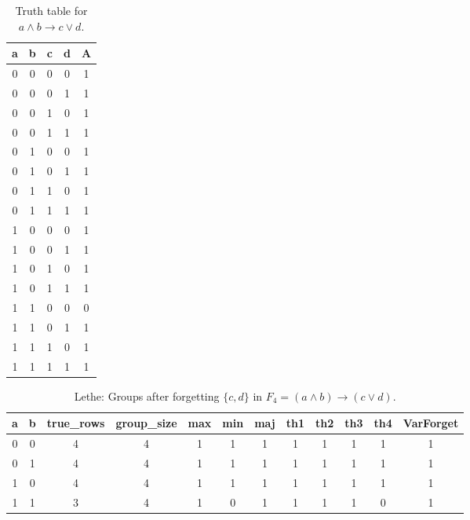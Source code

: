 \begin{table}[!tb]
    \centering
    \begin{tabular}{|c|c|c|c|c|}
        \hline
        \textbf{a} & \textbf{b} & \textbf{c} & \textbf{d} & \textbf{A} \\ \hline
        0 & 0 & 0 & 0 & 1 \\ \hline
        0 & 0 & 0 & 1 & 1 \\ \hline
        0 & 0 & 1 & 0 & 1 \\ \hline
        0 & 0 & 1 & 1 & 1 \\ \hline
        0 & 1 & 0 & 0 & 1 \\ \hline
        0 & 1 & 0 & 1 & 1 \\ \hline
        0 & 1 & 1 & 0 & 1 \\ \hline
        0 & 1 & 1 & 1 & 1 \\ \hline
        1 & 0 & 0 & 0 & 1 \\ \hline
        1 & 0 & 0 & 1 & 1 \\ \hline
        1 & 0 & 1 & 0 & 1 \\ \hline
        1 & 0 & 1 & 1 & 1 \\ \hline
        1 & 1 & 0 & 0 & 0 \\ \hline
        1 & 1 & 0 & 1 & 1 \\ \hline
        1 & 1 & 1 & 0 & 1 \\ \hline
        1 & 1 & 1 & 1 & 1 \\ \hline
    \end{tabular}
    \caption{Truth table for $a \land b \rightarrow c \lor d$.}
    \label{tab:truthtab}
\end{table}

\begin{table}[!tb]
    \centering
    \begin{tabular}{|c|c|c|c|c|c|c|c|c|c|c|c|}
        \hline
        \textbf{a} & \textbf{b} & \textbf{true\_rows} & \textbf{group\_size} & \textbf{max} & \textbf{min} & \textbf{maj} & \textbf{th1} & \textbf{th2} & \textbf{th3} & \textbf{th4} & \textbf{VarForget} \\ \hline
        \rowcolor{gray!40} 0 & 0 & 4 & 4 & 1 & 1 & 1 & 1 & 1 & 1 & 1 & 1 \\ \hline
        \rowcolor{blue!40} 0 & 1 & 4 & 4 & 1 & 1 & 1 & 1 & 1 & 1 & 1 & 1 \\ \hline
        \rowcolor{red!40} 1 & 0 & 4 & 4 & 1 & 1 & 1 & 1 & 1 & 1 & 1 & 1 \\ \hline
        \rowcolor{green!40} 1 & 1 & 3 & 4 & 1 & 0 & 1 & 1 & 1 & 1 & 0 & 1 \\ \hline
    \end{tabular}
    \caption{Lethe: Groups after forgetting $\{c, d\}$ in $F_{4} = (a \land b) \rightarrow (c \lor d)$.}
    \label{tab:lethe-F4-cd-groups}
\end{table}

